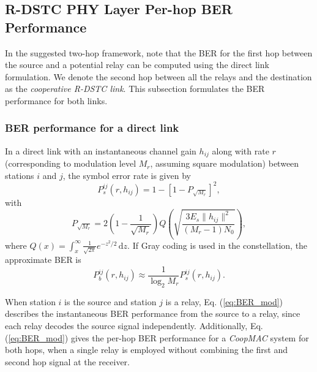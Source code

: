 \documentclass[peerreview,draftcls,onecolumn,12pt,a4paper]{IEEEtran}
\newcommand{\ud}{\,\mathrm{d}}
\begin{document}
\vspace{-0.15in}
\subsection{R-DSTC PHY Layer Per-hop BER Performance} \label{sec:berperformance}
\vspace{-0.05in}

In the suggested two-hop framework, note that the BER for the
first hop between the source and a potential relay can be computed
using the direct link formulation. We denote the second hop between
all the relays and the destination  as the {\em cooperative R-DSTC
link}. This subsection formulates the BER performance for both
links.


\subsubsection{BER performance for a direct link}\label{sec:singlelinkber}
In a direct link with an instantaneous channel gain $h_{ij}$ along
with rate $r$ (corresponding to modulation level $M_r$, assuming
square modulation) between stations $i$ and $j$, the symbol error
rate is given by \begin{equation}
P_{s}^{ij}(r,h_{ij})=1-[1-P_{\sqrt{M_r}}]^2, \label{eq:ser}
\end{equation}
with
\begin{equation}
P_{\sqrt{M_r}}=2
(1-\frac{1}{\sqrt{M_r}})Q\left({\sqrt{\frac{3E_{s}\|h_{ij}\|^2
}{(M_r-1)N_0}}}\right), \label{eq:prob}
\end{equation}
where $Q(x)=\int_x^\infty \frac{1}{\sqrt{2 \pi}} e^{-z^2 / 2} \ud
z$. If Gray coding is used in the constellation, the approximate BER is
\begin{equation}
P_{b}^{ij}(r,h_{ij})\approx \frac{1}{\log_2M_r}
P_{s}^{ij}(r,h_{ij}). \label{eq:BER_mod}
\end{equation}


When station $i$ is the source and station $j$ is a relay, Eq.
(\ref{eq:BER_mod}) describes the instantaneous BER performance
from the source to a relay, since each relay decodes the source
signal independently. Additionally, Eq. (\ref{eq:BER_mod}) gives
the per-hop BER performance for a \emph{CoopMAC} system
\cite{coopmacliu} for both hops, when  a single relay is employed
without combining the first and second hop signal at the receiver.
\end{document}
